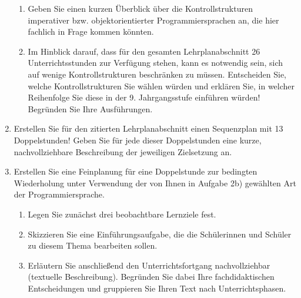 \documentclass{lehramt-informatik-aufgabe}
\begin{document}
\begin{enumerate}
\begin{enumerate}

\item Geben Sie einen kurzen Überblick über die Kontrollstrukturen
imperativer bzw. objektorientierter Programmiersprachen an, die hier
fachlich in Frage kommen könnten.


\item Im Hinblick darauf, dass für den gesamten Lehrplanabschnitt 26
Unterrichtsstunden zur Verfügung stehen, kann es notwendig sein, sich
auf wenige Kontrollstrukturen beschränken zu müssen. Entscheiden Sie,
welche Kontrollstrukturen Sie wählen würden und erklären Sie, in welcher
Reihenfolge Sie diese in der 9. Jahrgangsstufe einführen würden!
Begründen Sie Ihre Ausführungen.

\end{enumerate}


\item Erstellen Sie für den zitierten Lehrplanabschnitt einen
Sequenzplan mit 13 Doppelstunden! Geben Sie für jede dieser
Doppelstunden eine kurze, nachvollziehbare Beschreibung der jeweiligen
Zielsetzung an.


\item Erstellen Sie eine Feinplanung für eine Doppelstunde zur bedingten
Wiederholung unter Verwendung der von Ihnen in Aufgabe 2b) gewählten Art
der Programmiersprache.
\begin{enumerate}

\item Legen Sie zunächst drei beobachtbare Lernziele fest.


\item Skizzieren Sie eine Einführungsaufgabe, die die Schülerinnen und
Schüler zu diesem Thema bearbeiten sollen.


\item Erläutern Sie anschließend den Unterrichtsfortgang nachvollziehbar
(textuelle Beschreibung). Begründen Sie dabei Ihre fachdidaktischen
Entscheidungen und gruppieren Sie Ihren Text nach Unterrichtsphasen.

\end{enumerate}
\end{enumerate}
\end{document}
